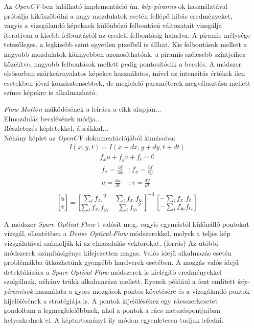 Az \textit{OpenCV}-ben található implementáció ún. \textit{kép-piramis}-ok használatával próbálja kiküszöbölni a nagy mozdulatok esetén fellépő hibás eredményeket, vagyis a vizsgálandó képeknek különböző felbontású változatait vizsgálja iteratívan a kisebb felbontástól az eredeti felbontásig haladva. A piramis mélysége tetszőleges, a legkisebb szint egyetlen pixelből is állhat. Kis felbontások mellett a nagyobb mozdulatok könnyebben azonosíthatóak, a piramis szélesebb szintjeihez közelítve, nagyobb felbontások mellett pedig pontosítódik a becslés. 
A módszer elsősorban szürkeárnyalatos képekre használatos, mivel az intenzitás értékek ilen esetekben jóval konzisztensebbek, de megfelelő paraméterek megválasztása mellett színes képekre is alkalmazható. \cite{bradski2008learning} 

\cite{lucas1981iterative} 
\textit{Flow Motion} működésének a leírása a cikk alapján...\\
Elmozdulás becslésének módja...\\
Részletezés képletekkel, ábrákkal...\\
Néhány képlet az \textit{OpenCV} dokumentációjából kimásolva:
\begin{align*}
I(x,y,t) = I(x+dx,y+dy,t+dt)
\end{align*}
\begin{align*}
f_xu+f_yv+f_t=0
\end{align*}
\begin{align*}
f_x = \frac{\partial f}{\partial x} &; f_y = \frac{\partial f}{\partial y}\\
u = \frac{dx}{dt} &; v = \frac{dy}{dt}
\end{align*}
\begin{align*}
\bmatrix u \\ v \endbmatrix = {\bmatrix {\sum_{i}f_{x_i}}^2 & \sum_{i}f_{x_i}f_{y_i}\\ \sum_{i}f_{x_i}f_{y_i} & {\sum_{i}f_{y_i}}^2 \endbmatrix}^{-1} \bmatrix -\sum_{i}f_{x_i}f_{t_i} \\ -\sum_{i}f_{y_i}f_{t_i} \endbmatrix
\end{align*}

A módszer \textit{Spare Optical-Flow}-t valósít meg, vagyis egymástól különálló pontokat vizsgál, ellentétben a \textit{Dense Optical-Flow} módszerekkel, melyek a teljes kép vizsgálatával számolják ki az elmozdulás vektorokat. (forrás) Az utóbbi módszerek számításigénye kifejezetten magas. Valós idejű alkalmazás esetén problémákba ütközhetünk gyengébb hardverek esetében. A mozgás valós idejű detektálására a \textit{Spare Optical-Flow} módszerek is kielégítő eredményekkel szolgálnak, néhány trükk alkalmazása mellett. Ilyenek például a fent említett \textit{kép-piramisok} használata a gyors mozgások pontos követésére és a vizsgálandó pontok kijelölésének a stratégiája is. A pontok kijelöléséhez egy rácsszerkezetet gondoltam a legmegfelelőbbnek, ahol a pontok a rács metszéspontjaiban helyezkednek el. A képtartományt ily módon egyenletesen tudjuk lefedni.

